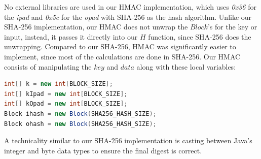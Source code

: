 No external libraries are used in our HMAC implementation, which uses \textit{0x36} for the \textit{ipad} and \textit{0x5c} for the \textit{opad} with SHA-256 as the hash algorithm. Unlike our SHA-256 implementation, our HMAC does not unwrap the $Block$'s for the key or input, instead, it passes it directly into our $H$ function, since SHA-256 does the unwrapping. Compared to our SHA-256, HMAC was significantly easier to implement, since most of the calculations are done in SHA-256. 
Our HMAC consists of manipulating the $key$ and $data$ along with these local variables:
\begin{lstlisting}[language=Java]
int[] k = new int[BLOCK_SIZE];
int[] kIpad = new int[BLOCK_SIZE];
int[] kOpad = new int[BLOCK_SIZE];
Block ihash = new Block(SHA256_HASH_SIZE);
Block ohash = new Block(SHA256_HASH_SIZE);
\end{lstlisting}
A technicality similar to our SHA-256 implementation is casting between Java's integer and byte data types to ensure the final digest is correct.
